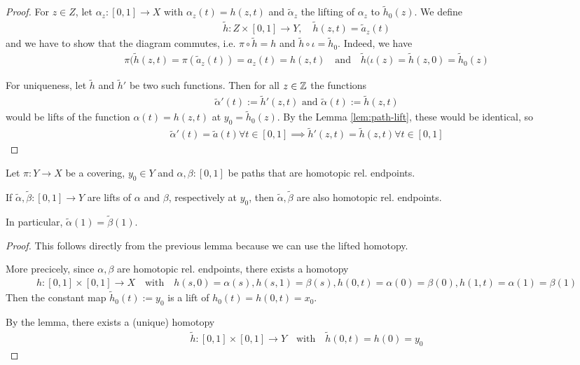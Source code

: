 \begin{proof}
  For $z \in Z$,
  let $\alpha_z: [0,1] \to X$ with $\alpha_z(t) = h(z,t)$ and $\tilde{\alpha}_z$ the lifting of $\alpha_z$ to $\tilde{h}_0(z)$.
  We define
  \begin{align*}
    \tilde{h}: Z \times [0,1] \to Y, \quad \tilde{h}(z,t) = \tilde{a}_z(t)
  \end{align*}
  and we have to show that the diagram commutes, i.e.
  $\pi \circ \tilde{h} = h$ and $\tilde{h} \circ \iota = \tilde{h}_0$.
  Indeed, we have
  \begin{align*}
    \pi(\tilde{h}(z,t) = \pi(\tilde{a}_z(t)) = a_z(t) = h(z,t) \quad \text{and} \quad \tilde{h}(\iota(z) = \tilde{h}(z,0) = \tilde{h}_0(z)
  \end{align*}
  
  For uniqueness, let $\tilde{h}$ and $\tilde{h}'$ be two such functions. Then for all $z \in \mathbb{Z}$ the functions
  \begin{align*}
    \tilde{\alpha}'(t) := \tilde{h}'(z,t) \text{ and } \tilde{\alpha}(t) := \tilde{h}(z,t)
  \end{align*}
  would be lifts of the function $\alpha(t) = h(z,t)$ at $y_0 = \tilde{h}_0(z)$.
  By the Lemma \ref{lem:path-lift}, these would be identical, so
  \begin{align*}
    \tilde{\alpha}'(t) = \tilde{a}(t) \forall t \in [0,1] \implies \tilde{h}'(z,t) = \tilde{h}(z,t) \forall t \in [0,1]
  \end{align*}
\end{proof}

\begin{cor}\label{cor:monodromy}
  Let $\pi: Y \to X$ be a covering, $y_0 \in Y$ and $\alpha,\beta:[0,1]$ be paths that are homotopic rel. endpoints.

  If $\tilde{\alpha},\tilde{\beta}:[0,1] \to Y$ are lifts of $\alpha$ and $\beta$, respectively at $y_0$, then $\tilde{\alpha}, \tilde{\beta}$ are also homotopic rel. endpoints.

  In particular, $\tilde{\alpha}(1) = \tilde{\beta}(1)$.
\end{cor}
\begin{proof}
This follows directly from the previous lemma because we can use the lifted homotopy.

More precicely, since $\alpha,\beta$ are homotopic rel. endpoints, there exists a homotopy
\begin{align*}
  h: [0,1] \times [0,1] \to X \quad \text{with} \quad h(s,0) = \alpha(s), h(s,1) = \beta(s), h(0,t) = \alpha(0) = \beta(0), h(1,t) = \alpha(1) = \beta(1)
\end{align*}
Then the constant map $\tilde{h}_0(t) := y_0$ is a lift of $h_0(t) = h(0,t) = x_0$.

By the lemma, there exists a (unique) homotopy
\begin{align*}
  \tilde{h}:[0,1] \times[0,1] \to Y \quad \text{with} \quad \tilde{h}(0,t) = h(0) = y_0
\end{align*}
\end{proof}





